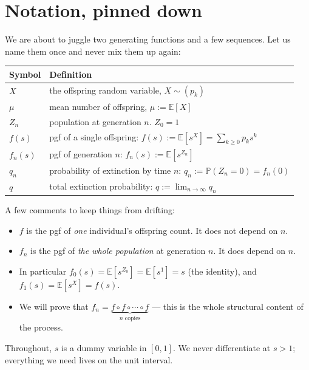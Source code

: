 \documentclass[11pt]{article}
\begin{document}
\section{Notation, pinned down}
We are about to juggle two generating functions and a few sequences. Let us name them once and never mix them up again:

\begin{center}
\renewcommand{\arraystretch}{1.35}
\begin{tabular}{@{}l@{\quad}l@{}}
\hline
\textbf{Symbol} & \textbf{Definition} \\
\hline
$X$           & the offspring random variable, $X \sim (p_k)$ \\
$\mu$         & mean number of offspring, $\mu := \mathbb{E}[X]$ \\
$Z_n$         & population at generation $n$. $Z_0 = 1$ \\
$f(s)$        & pgf of a single offspring: $f(s) := \mathbb{E}\!\left[s^X\right] = \sum_{k \geq 0} p_k s^k$ \\
$f_n(s)$      & pgf of generation $n$: $f_n(s) := \mathbb{E}\!\left[s^{Z_n}\right]$ \\
$q_n$         & probability of extinction by time $n$: $q_n := \mathbb{P}(Z_n = 0) = f_n(0)$ \\
$q$           & total extinction probability: $q := \lim_{n \to \infty} q_n$ \\
\hline
\end{tabular}
\end{center}

A few comments to keep things from drifting:
\begin{itemize}[leftmargin=*, itemsep=2pt]
  \item $f$ is the pgf of \emph{one} individual's offspring count. It does not depend on $n$.
  \item $f_n$ is the pgf of \emph{the whole population} at generation $n$. It does depend on $n$.
  \item In particular $f_0(s) = \mathbb{E}[s^{Z_0}] = \mathbb{E}[s^1] = s$ (the identity), and $f_1(s) = \mathbb{E}[s^X] = f(s)$.
  \item We will prove that $f_n = \underbrace{f \circ f \circ \cdots \circ f}_{n \text{ copies}}$ --- this is the whole structural content of the process.
\end{itemize}

Throughout, $s$ is a dummy variable in $[0, 1]$. We never differentiate at $s > 1$; everything we need lives on the unit interval.
\end{document}
